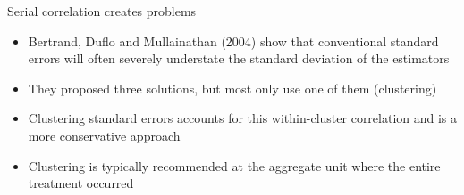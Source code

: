 \documentclass{beamer}
\begin{document}
\begin{frame}{Serial correlation creates problems}
  \begin{itemize}
	\item  Bertrand, Duflo and Mullainathan (2004) show that conventional standard errors will often severely understate the standard deviation of the estimators
	\item They proposed three solutions, but most only use one of them (clustering)
	    \item Clustering standard errors accounts for this within-cluster correlation and is a more conservative approach 
	    \item Clustering is typically recommended at the aggregate unit where the entire treatment occurred

  \end{itemize}
\end{frame}






  
  

\end{document}
